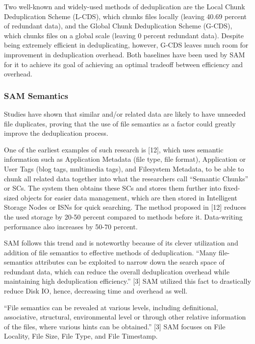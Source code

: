 \documentclass[journal]{IEEEtran}
\begin{document}
Two well-known and widely-used methods of deduplication are the Local Chunk Deduplication Scheme (L-CDS), which chunks files locally (leaving 40.69 percent of redundant data), and the Global Chunk Deduplication Scheme (G-CDS), which chunks files on a global scale (leaving 0 percent redundant data). Despite being extremely efficient in deduplicating, however, G-CDS leaves much room for improvement in deduplication overhead. Both baselines have been used by SAM for it to achieve its goal of achieving an optimal tradeoff between efficiency and overhead.

\subsubsection{SAM Semantics}

Studies have shown that similar and/or related data are likely to have unneeded file duplicates, proving that the use of file semantics as a factor could greatly improve the deduplication process.

One of the earliest examples of such research is [12], which uses semantic information such as Application Metadata (file type, file format), Application or User Tags (blog tags, multimedia tags), and Filesystem Metadata, to be able to chunk all related data together into what the researchers call “Semantic Chunks” or SCs. The system then obtains these SCs and stores them further into fixed-sized objects for easier data management, which are then stored in Intelligent Storage Nodes or ISNs for quick searching. The method proposed in [12] reduces the used storage by 20-50 percent compared to methods before it. Data-writing performance also increases by 50-70 percent.

SAM follows this trend and is noteworthy because of its clever utilization and addition of file semantics to effective methods of deduplication. “Many file-semantics attributes can be exploited to narrow down the search space of redundant data, which can reduce the overall deduplication overhead while maintaining high deduplication efficiency.” [3] SAM utilized this fact to drastically reduce Disk IO, hence, decreasing time and overhead as well. 

“File semantics can be revealed at various levels, including definitional, associative, structural, environmental level or through other relative information of the files, where various hints can be obtained.” [3] SAM focuses on File Locality, File Size, File Type, and File Timestamp.
\end{document}
